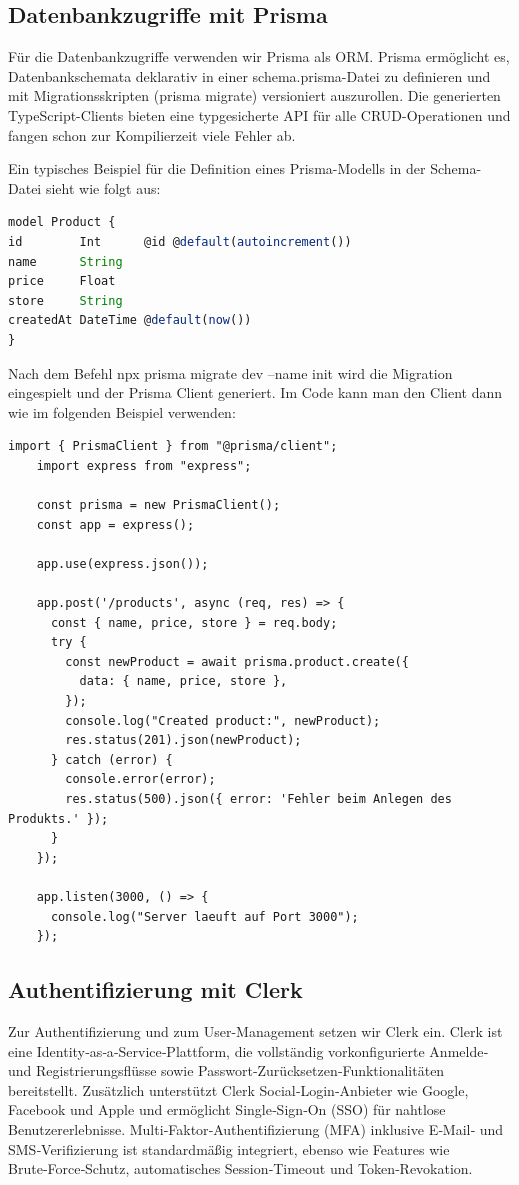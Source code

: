 \documentclass[12pt, a4paper]{report} %
\begin{document}
\subsection{Datenbankzugriffe mit Prisma}
Für die Datenbankzugriffe verwenden wir Prisma als ORM. Prisma ermöglicht es, Datenbankschemata deklarativ in einer schema.prisma-Datei zu definieren und mit Migrationsskripten (prisma migrate) versioniert auszurollen. Die generierten TypeScript-Clients bieten eine typgesicherte API für alle CRUD-Operationen und fangen schon zur Kompilierzeit viele Fehler ab.

Ein typisches Beispiel für die Definition eines Prisma-Modells in der Schema-Datei sieht wie folgt aus:

\begin{lstlisting}[language=TypeScript,caption={Schema-Definition mit Prisma}]
model Product {
id        Int      @id @default(autoincrement())
name      String
price     Float
store     String
createdAt DateTime @default(now())
}
\end{lstlisting}

Nach dem Befehl npx prisma migrate dev --name init wird die Migration eingespielt und der Prisma Client generiert. Im Code kann man den Client dann wie im folgenden Beispiel verwenden:

\begin{lstlisting}[style=typescriptstyle,caption={Beispielhafte Verwendung des Prisma Client}]
    import { PrismaClient } from "@prisma/client";
    import express from "express";
    
    const prisma = new PrismaClient();
    const app = express();
    
    app.use(express.json());
    
    app.post('/products', async (req, res) => {
      const { name, price, store } = req.body;
      try {
        const newProduct = await prisma.product.create({
          data: { name, price, store },
        });
        console.log("Created product:", newProduct);
        res.status(201).json(newProduct);
      } catch (error) {
        console.error(error);
        res.status(500).json({ error: 'Fehler beim Anlegen des Produkts.' });
      }
    });
    
    app.listen(3000, () => {
      console.log("Server laeuft auf Port 3000");
    });
    \end{lstlisting}

\subsection{Authentifizierung mit Clerk}
Zur Authentifizierung und zum User-Management setzen wir Clerk ein. Clerk ist eine Identity‑as‑a‑Service‑Plattform, die vollständig vorkonfigurierte Anmelde‑ und Registrierungsflüsse sowie Passwort‑Zurücksetzen‑Funktionalitäten bereitstellt. Zusätzlich unterstützt Clerk Social‑Login‑Anbieter wie Google, Facebook und Apple und ermöglicht Single‑Sign‑On (SSO) für nahtlose Benutzererlebnisse. Multi‑Faktor‑Authentifizierung (MFA) inklusive E‑Mail‑ und SMS‑Verifizierung ist standardmäßig integriert, ebenso wie Features wie Brute‑Force‑Schutz, automatisches Session‑Timeout und Token‑Revokation.
\end{document}
